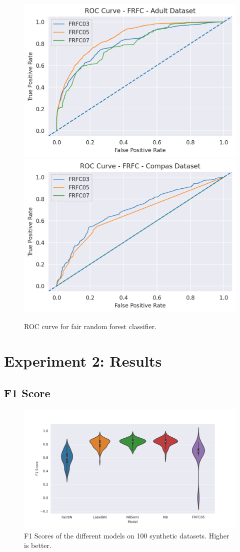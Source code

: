 \begin{figure}
    \centering
    \includegraphics[width=0.49\linewidth]{figures/adult_frfc_roc.png}
    \includegraphics[width=0.49\linewidth]{figures/compas_frfc_roc.png}
    \caption{ROC curve for fair random forest classifier.}
    \label{fig:exp1FRFCROC}
\end{figure}

\section{Experiment 2: Results}
\label{eval:exp2}

\subsection{F1 Score}

\begin{figure}
    \centering
    \includegraphics[width=\linewidth]{figures/F1score-synthethic.png}
    \caption{F1 Scores of the different models on 100 synthetic datasets. Higher is better.}
    \label{fig:f1synth}
\end{figure}

